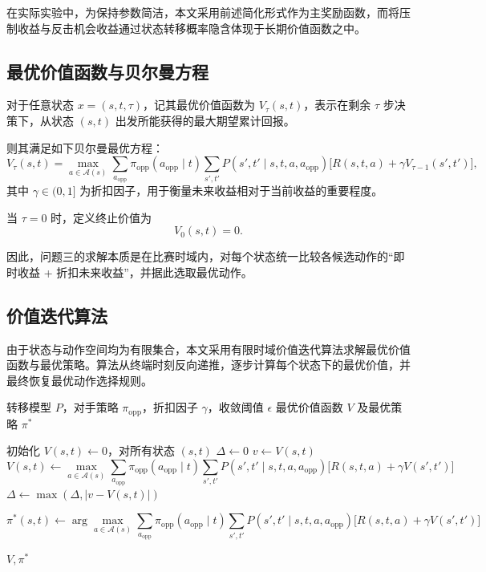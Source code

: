 在实际实验中，为保持参数简洁，本文采用前述简化形式作为主奖励函数，而将压制收益与反击机会收益通过状态转移概率隐含体现于长期价值函数之中。

\subsection{最优价值函数与贝尔曼方程}

对于任意状态 \(x=(s,t,\tau)\)，记其最优价值函数为 \(V_\tau(s,t)\)，表示在剩余 \(\tau\) 步决策下，从状态 \((s,t)\) 出发所能获得的最大期望累计回报。

则其满足如下贝尔曼最优方程：
\[
V_\tau(s,t)
=
\max_{a\in\mathcal{A}(s)}
\sum_{a_{\text{opp}}}
\pi_{\text{opp}}(a_{\text{opp}}\mid t)
\sum_{s',t'}
P(s',t'\mid s,t,a,a_{\text{opp}})
\Big[
R(s,t,a)+\gamma V_{\tau-1}(s',t')
\Big],
\]
其中 \(\gamma\in(0,1]\) 为折扣因子，用于衡量未来收益相对于当前收益的重要程度。

当 \(\tau=0\) 时，定义终止价值为
\[
V_0(s,t)=0.
\]

因此，问题三的求解本质是在比赛时域内，对每个状态统一比较各候选动作的“即时收益 + 折扣未来收益”，并据此选取最优动作。

\subsection{价值迭代算法}

由于状态与动作空间均为有限集合，本文采用有限时域价值迭代算法求解最优价值函数与最优策略。算法从终端时刻反向递推，逐步计算每个状态下的最优价值，并最终恢复最优动作选择规则。

\begin{algorithm}[H]
\caption{单场竞技最优策略价值迭代}
\label{alg:mdp_vi}
\begin{algorithmic}[1]
\Require 转移模型 \(P\)，对手策略 \(\pi_{\text{opp}}\)，折扣因子 \(\gamma\)，收敛阈值 \(\epsilon\)
\Ensure 最优价值函数 \(V\) 及最优策略 \(\pi^\ast\)

\State 初始化 \(V(s,t)\gets 0\)，对所有状态 \((s,t)\)
\Repeat
    \State \(\Delta\gets 0\)
        \State \(v\gets V(s,t)\)
        \State
        \[
        V(s,t)\gets
        \max_{a\in\mathcal{A}(s)}
        \sum_{a_{\text{opp}}}\pi_{\text{opp}}(a_{\text{opp}}\mid t)
        \sum_{s',t'}
        P(s',t'\mid s,t,a,a_{\text{opp}})
        \big[
        R(s,t,a)+\gamma V(s',t')
        \big]
        \]
        \State \(\Delta\gets \max(\Delta,|v-V(s,t)|)\)
    \EndFor
\Until{\(\Delta<\epsilon\)}

    \State
    \[
    \pi^\ast(s,t)
    \gets
    \arg\max_{a\in\mathcal{A}(s)}
    \sum_{a_{\text{opp}}}\pi_{\text{opp}}(a_{\text{opp}}\mid t)
    \sum_{s',t'}
    P(s',t'\mid s,t,a,a_{\text{opp}})
    \big[
    R(s,t,a)+\gamma V(s',t')
    \big]
    \]
\EndFor

\State \Return \(V,\pi^\ast\)
\end{algorithmic}
\end{algorithm}

